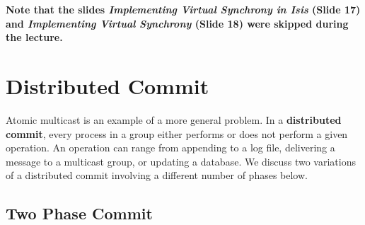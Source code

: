 \documentclass[twoside]{article}
\begin{document}
\textbf{Note that the slides \emph{Implementing Virtual Synchrony in Isis} (Slide 17) and \emph{Implementing Virtual Synchrony} (Slide 18) were skipped during the lecture.}

\section{Distributed Commit}

Atomic multicast is an example of a more general problem. In a \textbf{distributed commit}, every process in a group either performs or does not perform a given operation. An operation can range from appending to a log file, delivering a message to a multicast group, or updating a database. We discuss two variations of a distributed commit involving a different number of phases below.

\subsection{Two Phase Commit}
\end{document}
